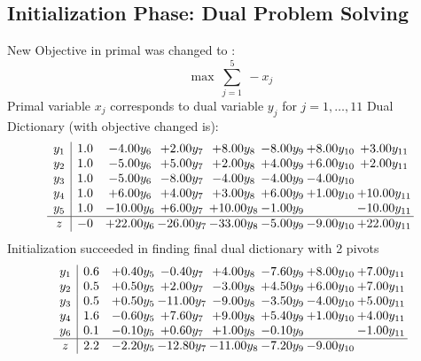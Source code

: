 \documentclass[8pt]{article}
\begin{document}
\subsection{Initialization Phase: Dual Problem Solving}
New Objective in primal was changed to : \[ \max\ \sum_{j=1}^{5}\ - x_j \] 
Primal variable $x_j$ corresponds to dual variable $y_j$ for $j = 1,\ldots,11$
Dual Dictionary (with objective changed is): 
\[\begin{array}{c| c c@{\hskip 2pt} c@{\hskip 2pt} c@{\hskip 2pt} c@{\hskip 2pt} c@{\hskip 2pt} c@{\hskip 2pt} }
 y_{1}   &  1.0 & -4.00 y_{6} & +  2.00 y_{7} & +  8.00 y_{8} & -8.00 y_{9} & +  8.00 y_{10} & +  3.00 y_{11}\\
 y_{2}   &  1.0 & -5.00 y_{6} & +  5.00 y_{7} & +  2.00 y_{8} & +  4.00 y_{9} & +  6.00 y_{10} & +  2.00 y_{11}\\
 y_{3}   &  1.0 & -5.00 y_{6} & -8.00 y_{7} & -4.00 y_{8} & -4.00 y_{9} & -4.00 y_{10} &   \\
 y_{4}   &  1.0 & +  6.00 y_{6} & +  4.00 y_{7} & +  3.00 y_{8} & +  6.00 y_{9} & +  1.00 y_{10} & + 10.00 y_{11}\\
 y_{5}   &  1.0 & -10.00 y_{6} & +  6.00 y_{7} & + 10.00 y_{8} & -1.00 y_{9} &   & -10.00 y_{11}\\
\hline
z    &  -0 & + 22.00 y_{6} & -26.00 y_{7} & -33.00 y_{8} & -5.00 y_{9} & -9.00 y_{10} & + 22.00 y_{11}\\
\end{array}\]
Initialization succeeded in finding final dual dictionary with 2 pivots
\[\begin{array}{c| c c@{\hskip 2pt} c@{\hskip 2pt} c@{\hskip 2pt} c@{\hskip 2pt} c@{\hskip 2pt} c@{\hskip 2pt} }
 y_{1}   &  0.6 & +  0.40 y_{5} & -0.40 y_{7} & +  4.00 y_{8} & -7.60 y_{9} & +  8.00 y_{10} & +  7.00 y_{11}\\
 y_{2}   &  0.5 & +  0.50 y_{5} & +  2.00 y_{7} & -3.00 y_{8} & +  4.50 y_{9} & +  6.00 y_{10} & +  7.00 y_{11}\\
 y_{3}   &  0.5 & +  0.50 y_{5} & -11.00 y_{7} & -9.00 y_{8} & -3.50 y_{9} & -4.00 y_{10} & +  5.00 y_{11}\\
 y_{4}   &  1.6 & -0.60 y_{5} & +  7.60 y_{7} & +  9.00 y_{8} & +  5.40 y_{9} & +  1.00 y_{10} & +  4.00 y_{11}\\
 y_{6}   &  0.1 & -0.10 y_{5} & +  0.60 y_{7} & +  1.00 y_{8} & -0.10 y_{9} &   & -1.00 y_{11}\\
\hline
z    &  2.2 & -2.20 y_{5} & -12.80 y_{7} & -11.00 y_{8} & -7.20 y_{9} & -9.00 y_{10} &   \\
\end{array}\]
\end{document}
